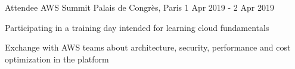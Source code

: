 \begin{cventries}

 \cventry
    {Attendee} %
    {AWS Summit} %
    {Palais de Congrès, Paris} %
    {1 Apr 2019 - 2 Apr 2019} %
    {
      \begin{cvitems} %
        \item {Participating in a training day intended for learning cloud fundamentals  }
        \item {Exchange with AWS teams about architecture, security, performance and cost optimization in the platform }
      \end{cvitems}
    }

\end{cventries}
